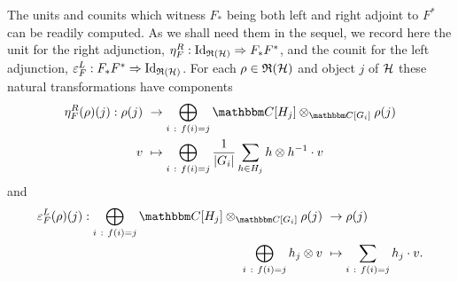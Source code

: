 The units and counits which witness $F_*$ being both left and right adjoint to $F^*$ can be readily computed. As we shall need them in the sequel, we record here  the unit for the right adjunction, $\eta_F^R: \operatorname{Id}_{\mathfrak{R}(\mathcal{H})} \Rightarrow F_* F^*$, and the counit for the left adjunction, $\varepsilon_F^L: F_*F^* \Rightarrow \operatorname{Id}_{\mathfrak{R}(\mathcal{H})}$. For each $\rho \in \mathfrak{R}(\mathcal{H})$ and object $j$ of $\mathcal{H}$ these natural transformations have components
\begin{align}
\label{unitexp}
\eta_F^R(\rho)(j): \rho(j) \ &\to \bigoplus_{i \ : \ f(i)=j} \CC[H_j] \otimes_{\CC[G_i]} \rho(j) \\ \nonumber
v \ &\mapsto \bigoplus_{i \ : \ f(i)=j} \frac{1}{| G_i |} \sum_{h \in H_j} h \otimes h^{-1} \cdot v
\end{align}
and
\begin{align}
\label{counitexp}
\eps_F^L(\rho)(j): \bigoplus_{i \ : \ f(i)=j} \CC[H_j] \otimes_{\CC[G_i]} \rho(j) \ &\to \rho(j) \\ \nonumber
\bigoplus_{i \ : \ f(i)=j} h_j \otimes v \ &\mapsto \sum_{i \ : \ f(i)=j} h_j \cdot v.
\end{align}





